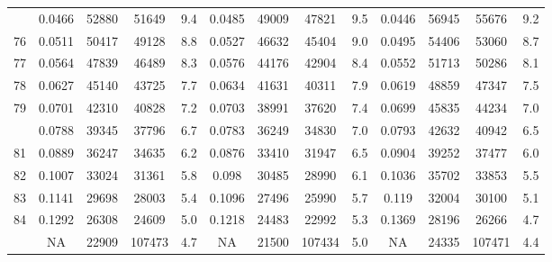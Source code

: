 \documentclass[
  14pt,
]{article}
\begin{document}
\begin{longtable}[t]{lcccccccccccc}
\addlinespace
75 & 0.0466 & 52880 & 51649 & 9.4 & 0.0485 & 49009 & 47821 & 9.5 & 0.0446 & 56945 & 55676 & 9.2\\
76 & 0.0511 & 50417 & 49128 & 8.8 & 0.0527 & 46632 & 45404 & 9.0 & 0.0495 & 54406 & 53060 & 8.7\\
77 & 0.0564 & 47839 & 46489 & 8.3 & 0.0576 & 44176 & 42904 & 8.4 & 0.0552 & 51713 & 50286 & 8.1\\
78 & 0.0627 & 45140 & 43725 & 7.7 & 0.0634 & 41631 & 40311 & 7.9 & 0.0619 & 48859 & 47347 & 7.5\\
79 & 0.0701 & 42310 & 40828 & 7.2 & 0.0703 & 38991 & 37620 & 7.4 & 0.0699 & 45835 & 44234 & 7.0\\
\addlinespace
80 & 0.0788 & 39345 & 37796 & 6.7 & 0.0783 & 36249 & 34830 & 7.0 & 0.0793 & 42632 & 40942 & 6.5\\
81 & 0.0889 & 36247 & 34635 & 6.2 & 0.0876 & 33410 & 31947 & 6.5 & 0.0904 & 39252 & 37477 & 6.0\\
82 & 0.1007 & 33024 & 31361 & 5.8 & 0.098 & 30485 & 28990 & 6.1 & 0.1036 & 35702 & 33853 & 5.5\\
83 & 0.1141 & 29698 & 28003 & 5.4 & 0.1096 & 27496 & 25990 & 5.7 & 0.119 & 32004 & 30100 & 5.1\\
84 & 0.1292 & 26308 & 24609 & 5.0 & 0.1218 & 24483 & 22992 & 5.3 & 0.1369 & 28196 & 26266 & 4.7\\
\addlinespace
85 & NA & 22909 & 107473 & 4.7 & NA & 21500 & 107434 & 5.0 & NA & 24335 & 107471 & 4.4\\*
\end{longtable}
\end{document}
